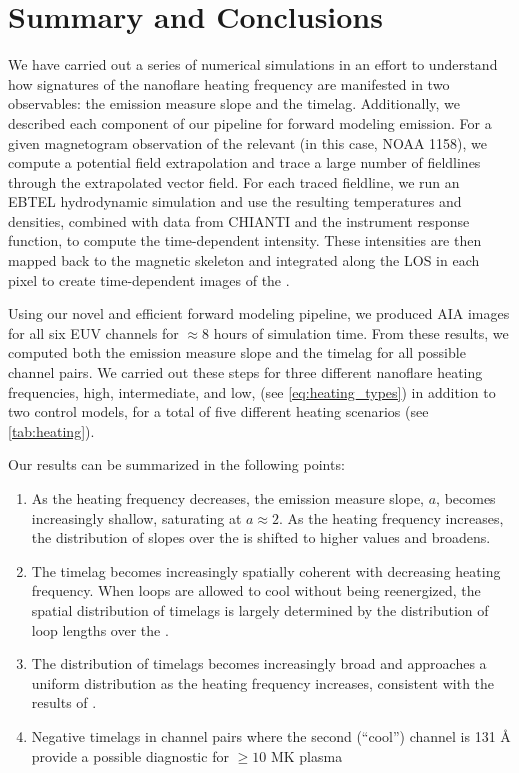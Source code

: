 \section{Summary and Conclusions}\label{conclusions}

We have carried out a series of numerical simulations in an effort to understand how signatures of the nanoflare heating frequency are manifested in two observables: the emission measure slope and the timelag. Additionally, we described each component of our pipeline for forward modeling \AR{} emission. For a given magnetogram observation of the relevant \AR{} (in this case, NOAA 1158), we compute a potential field extrapolation and trace a large number of fieldlines through the extrapolated vector field. For each traced fieldline, we run an EBTEL hydrodynamic simulation and use the resulting temperatures and densities, combined with data from CHIANTI and the instrument response function, to compute the time-dependent intensity. These intensities are then mapped back to the magnetic skeleton and integrated along the LOS in each pixel to create time-dependent images of the \AR{}.

Using our novel and efficient forward modeling pipeline, we produced AIA images for all six EUV channels for $\approx8$ hours of simulation time. From these results, we computed both the emission measure slope and the timelag for all possible channel pairs. We carried out these steps for three different nanoflare heating frequencies, high, intermediate, and low, (see \autoref{eq:heating_types}) in addition to two control models, for a total of five different heating scenarios (see \autoref{tab:heating}).

Our results can be summarized in the following points:
\begin{enumerate}
    \item As the heating frequency decreases, the emission measure slope, $a$, becomes increasingly shallow, saturating at $a\approx2$. As the heating frequency increases, the distribution of slopes over the \AR{} is shifted to higher values and broadens.
    \item The timelag becomes increasingly spatially coherent with decreasing heating frequency. When loops are allowed to cool without being reenergized, the spatial distribution of timelags is largely determined by the distribution of loop lengths over the \AR{}.
    \item The distribution of timelags becomes increasingly broad and approaches a uniform distribution as the heating frequency increases, consistent with the results of \citet{viall_signatures_2016}.
    \item Negative timelags in channel pairs where the second (``cool'') channel is 131 \AA{} provide a possible diagnostic for $\ge10$ MK plasma
\end{enumerate}

